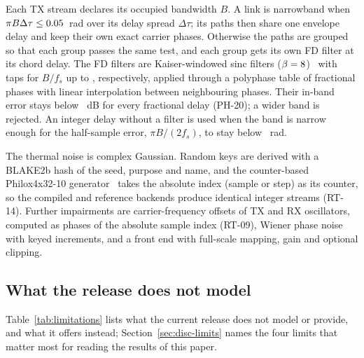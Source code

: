Each TX stream declares its occupied bandwidth $B$. A link is narrowband when
$\pi B\Delta\tau\le0.05$~rad over its delay spread $\Delta\tau$; its paths then
share one envelope delay and keep their own exact carrier phases. Otherwise the paths are
grouped so that each group passes the same test, and each group gets its own
FD filter at its chord delay. The FD filters are Kaiser-windowed sinc
filters ($\beta=8$)~\cite{Laakso1996FracDelay} with \numFdTaps{} taps for
$B/f_s$ up to \numFdBands{}, respectively, applied through a polyphase table of
\numFdPhases{} fractional phases with linear interpolation between neighbouring phases.
Their in-band error stays below \numFdTargetDb~dB for every fractional delay (PH-20); a
wider band is rejected. An integer delay without a filter is used when the band is narrow
enough for the half-sample error, $\pi B/(2f_s)$, to stay below \numIntegerDelayRad~rad.

The thermal noise is complex Gaussian. Random keys are derived with
a BLAKE2b hash of the seed, purpose and name, and the counter-based Philox4x32-10
generator~\cite{Salmon2011Philox} takes the absolute index (sample or step) as its counter,
so the compiled and reference backends produce identical integer streams (RT-14). Further
impairments are carrier-frequency offsets of TX and RX oscillators,
computed as phases of the absolute sample index (RT-09), Wiener phase noise with keyed
increments, and a front end with full-scale mapping, gain and optional clipping.

\subsection{What the release does not model}

Table~\ref{tab:limitations} lists what the current release does not model or
provide, and what it offers instead; Section~\ref{sec:disc-limits} names the four limits that
matter most for reading the results of this paper.
